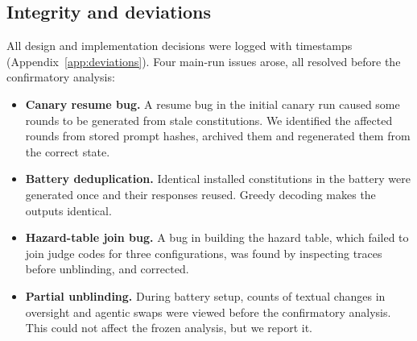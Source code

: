 \subsection{Integrity and deviations}
\label{sec:integrity}

All design and implementation decisions were logged with timestamps (Appendix~\ref{app:deviations}). Four main-run issues arose, all resolved before the confirmatory analysis:
\begin{itemize}
\item \textbf{Canary resume bug.} A resume bug in the initial canary run caused some rounds to be generated from stale constitutions. We identified the affected rounds from stored prompt hashes, archived them and regenerated them from the correct state.
\item \textbf{Battery deduplication.} Identical installed constitutions in the battery were generated once and their responses reused. Greedy decoding makes the outputs identical.
\item \textbf{Hazard-table join bug.} A bug in building the hazard table, which failed to join judge codes for three configurations, was found by inspecting traces before unblinding, and corrected.
\item \textbf{Partial unblinding.} During battery setup, counts of textual changes in oversight and agentic swaps were viewed before the confirmatory analysis. This could not affect the frozen analysis, but we report it.
\end{itemize}
